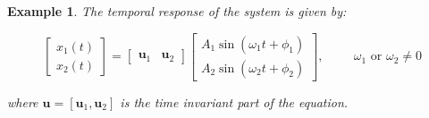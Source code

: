 \documentclass[12pt,letter]{article}
\newtheorem{ex}{Example}
\numberwithin{ex}{section} %
\newenvironment{example}{\begin{mdframed}[middlelinewidth=0.5mm]\begin{ex}\normalfont}{\end{ex}\end{mdframed}}
\numberwithin{re}{section} %
\numberwithin{vcs}{section} %
\begin{document}
\begin{example}
\pagebreak


The temporal response of the system is given by:

\begin{equation}
\begin{bmatrix} x_1(t) \\  x_2(t) \end{bmatrix} =  \begin{bmatrix} \mathbf{u}_1 & \mathbf{u}_2 \end{bmatrix}
\begin{bmatrix} A_1 \sin (\omega_1 t + \phi_1 )\\ A_2 \sin (\omega_2 t + \phi_2 )\end{bmatrix}, \hspace{1cm} \omega_1 \text{ or } \omega_2 \neq 0
\end{equation}

where $\mathbf{u} = [\mathbf{u}_1, \mathbf{u}_2]$ is the time invariant part of the equation. 


\end{example}
		

		
		
		
\end{document}

